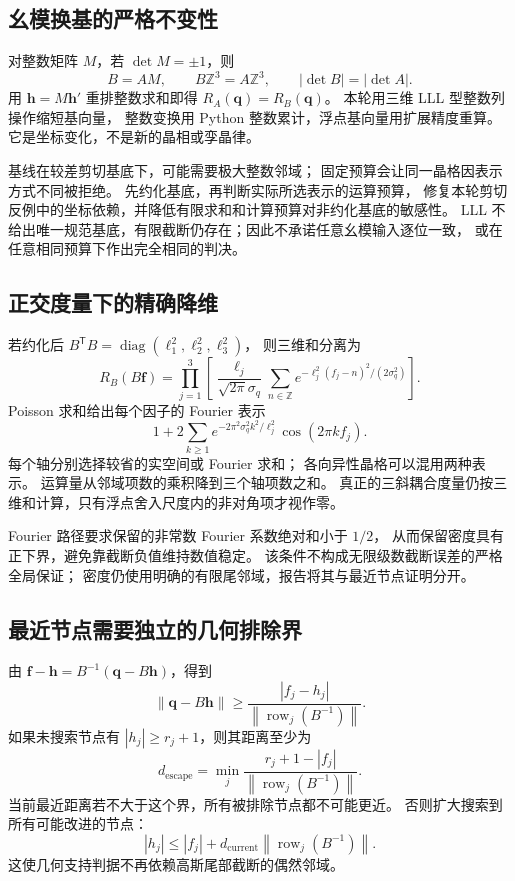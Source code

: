 \documentclass[UTF8,11pt,a4paper,fontset=fandol]{ctexart}
\newcommand{\Z}{\mathbb Z}
\newcommand{\diag}{\operatorname{diag}}
\newcommand{\norm}[1]{\left\lVert#1\right\rVert}
\newcommand{\T}{^{\mathsf T}}
\begin{document}
\subsection{幺模换基的严格不变性}

对整数矩阵 $M$，若 $\det M=\pm1$，则
\begin{equation}
B=AM,\qquad B\Z^3=A\Z^3,\qquad |\det B|=|\det A|.
\end{equation}
用 $\bm h=M\bm h'$ 重排整数求和即得
$R_A(\bm q)=R_B(\bm q)$。
本轮用三维 LLL 型整数列操作缩短基向量\cite{lll1982}，
整数变换用 Python 整数累计，浮点基向量用扩展精度重算。
它是坐标变化，不是新的晶相或孪晶律。

基线在较差剪切基底下，可能需要极大整数邻域；
固定预算会让同一晶格因表示方式不同被拒绝。
先约化基底，再判断实际所选表示的运算预算，
修复本轮剪切反例中的坐标依赖，并降低有限求和和计算预算对非约化基底的敏感性。
LLL 不给出唯一规范基底，有限截断仍存在；因此不承诺任意幺模输入逐位一致，
或在任意相同预算下作出完全相同的判决。

\subsection{正交度量下的精确降维}

若约化后 $B\T B=\diag(\ell_1^2,\ell_2^2,\ell_3^2)$，
则三维和分离为
\begin{equation}
R_B(B\bm f)=\prod_{j=1}^{3}
\left[\frac{\ell_j}{\sqrt{2\pi}\sigma_q}
\sum_{n\in\Z}e^{-\ell_j^2(f_j-n)^2/(2\sigma_q^2)}\right].
\end{equation}
Poisson 求和给出每个因子的 Fourier 表示
\begin{equation}
1+2\sum_{k\geq1}e^{-2\pi^2\sigma_q^2 k^2/\ell_j^2}
\cos(2\pi kf_j).
\end{equation}
每个轴分别选择较省的实空间或 Fourier 求和；
各向异性晶格可以混用两种表示。
运算量从邻域项数的乘积降到三个轴项数之和。
真正的三斜耦合度量仍按三维和计算，只有浮点舍入尺度内的非对角项才视作零。

Fourier 路径要求保留的非常数 Fourier 系数绝对和小于 $1/2$，
从而保留密度具有正下界，避免靠截断负值维持数值稳定。
该条件不构成无限级数截断误差的严格全局保证；
密度仍使用明确的有限尾邻域，报告将其与最近节点证明分开。

\subsection{最近节点需要独立的几何排除界}

由
$\bm f-\bm h=B^{-1}(\bm q-B\bm h)$，得到
\begin{equation}
\norm{\bm q-B\bm h}\geq
\frac{|f_j-h_j|}{\norm{\operatorname{row}_j(B^{-1})}}.
\end{equation}
如果未搜索节点有 $|h_j|\geq r_j+1$，则其距离至少为
\begin{equation}
d_{\mathrm{escape}}=
\min_j\frac{r_j+1-|f_j|}
{\norm{\operatorname{row}_j(B^{-1})}}.
\end{equation}
当前最近距离若不大于这个界，所有被排除节点都不可能更近。
否则扩大搜索到所有可能改进的节点：
\begin{equation}
|h_j|\leq |f_j|+
d_{\mathrm{current}}\norm{\operatorname{row}_j(B^{-1})}.
\end{equation}
这使几何支持判据不再依赖高斯尾部截断的偶然邻域。
\end{document}
